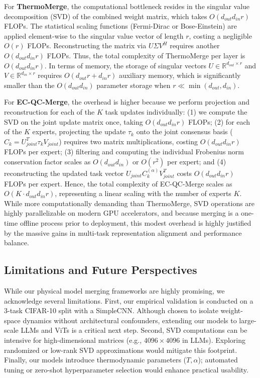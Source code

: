 \documentclass{article}
\theoremstyle{plain}
\theoremstyle{definition}
\theoremstyle{remark}
\begin{document}
For \textbf{ThermoMerge}, the computational bottleneck resides in the singular value decomposition (SVD) of the combined weight matrix, which takes $O(d_{out} d_{in} r)$ FLOPs. The statistical scaling functions (Fermi-Dirac or Bose-Einstein) are applied element-wise to the singular value vector of length $r$, costing a negligible $O(r)$ FLOPs. Reconstructing the matrix via $U \Sigma V^H$ requires another $O(d_{out} d_{in} r)$ FLOPs. Thus, the total complexity of ThermoMerge per layer is $O(d_{out} d_{in} r)$. In terms of memory, the storage of singular vectors $U \in \mathbb{R}^{d_{out} \times r}$ and $V \in \mathbb{R}^{d_{in} \times r}$ requires $O(d_{out} r + d_{in} r)$ auxiliary memory, which is significantly smaller than the $O(d_{out} d_{in})$ parameter storage when $r \ll \min(d_{out}, d_{in})$.

For \textbf{EC-QC-Merge}, the overhead is higher because we perform projection and reconstruction for each of the $K$ task updates individually: (1) we compute the SVD on the joint update matrix once, taking $O(d_{out} d_{in} r)$ FLOPs; (2) for each of the $K$ experts, projecting the update $\tau_k$ onto the joint consensus basis ($C_k = U_{joint}^T \tau_k V_{joint}$) requires two matrix multiplications, costing $O(d_{out} d_{in} r)$ FLOPs per expert; (3) filtering and computing the individual Frobenius norm conservation factor scales as $O(d_{out} d_{in})$ or $O(r^2)$ per expert; and (4) reconstructing the updated task vector $U_{joint} C_k^{(\alpha)} V_{joint}^T$ costs $O(d_{out} d_{in} r)$ FLOPs per expert. Hence, the total complexity of EC-QC-Merge scales as $O(K \cdot d_{out} d_{in} r)$, representing a linear scaling with the number of experts $K$. While more computationally demanding than ThermoMerge, SVD operations are highly parallelizable on modern GPU accelerators, and because merging is a one-time offline process prior to deployment, this modest overhead is highly justified by the massive gains in multi-task representation alignment and performance balance.

\subsection{Limitations and Future Perspectives}
While our physical model merging frameworks are highly promising, we acknowledge several limitations. First, our empirical validation is conducted on a 3-task CIFAR-10 split with a SimpleCNN. Although chosen to isolate weight-space dynamics without architectural confounders, extending our models to large-scale LLMs and ViTs is a critical next step. Second, SVD computations can be intensive for high-dimensional matrices (e.g., $4096 \times 4096$ in LLMs). Exploring randomized or low-rank SVD approximations would mitigate this footprint. Finally, our models introduce thermodynamic parameters ($T, \alpha$); automated tuning or zero-shot hyperparameter selection would enhance practical usability.
\end{document}
